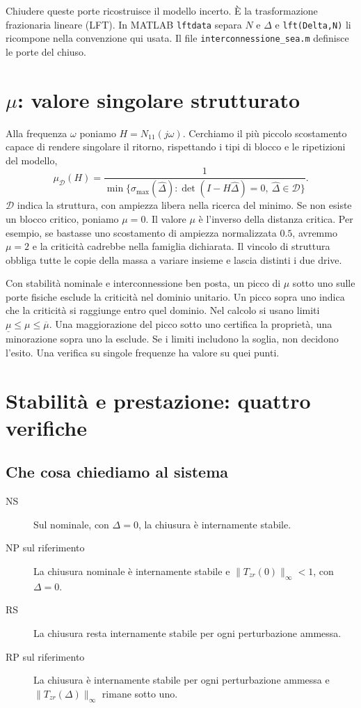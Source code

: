 Chiudere queste porte ricostruisce il modello incerto. È la
trasformazione frazionaria lineare (LFT). In MATLAB
\texttt{lftdata} separa $N$ e $\Delta$ e \texttt{lft(Delta,N)}
li ricompone nella convenzione qui usata. Il file
\texttt{interconnessione\_sea.m} definisce le porte del chiuso.

\section{\texorpdfstring{$\mu$}{mu}: valore singolare strutturato}

Alla frequenza $\omega$ poniamo $H=N_{11}(j\omega)$. Cerchiamo
il più piccolo scostamento capace di rendere singolare il ritorno,
rispettando i tipi di blocco e le ripetizioni del modello,
\begin{equation}\label{eq:mu-definition}
 \mu_{\mathcal D}(H)=
 \frac{1}{\min\{\sigma_{\max}(\widehat\Delta):
 \det(I-H\widehat\Delta)=0,\ \widehat\Delta\in\mathcal D\}}.
\end{equation}
$\mathcal D$ indica la struttura, con ampiezza libera nella ricerca
del minimo. Se non esiste un blocco critico, poniamo $\mu=0$.
Il valore $\mu$ è l'inverso della distanza critica. Per esempio,
se bastasse uno scostamento di ampiezza normalizzata $0.5$,
avremmo $\mu=2$ e la criticità cadrebbe nella famiglia dichiarata.
Il vincolo di struttura obbliga tutte le copie della massa a variare
insieme e lascia distinti i due drive.

Con stabilità nominale e interconnessione ben posta, un picco di
$\mu$ sotto uno sulle porte fisiche esclude la criticità nel dominio
unitario. Un picco sopra uno indica che la criticità si raggiunge
entro quel dominio. Nel calcolo si usano limiti
$\underline\mu\leq\mu\leq\overline\mu$. Una maggiorazione del picco
sotto uno certifica la proprietà, una minorazione sopra uno la
esclude. Se i limiti includono la soglia, non decidono l'esito.
Una verifica su singole frequenze ha valore su quei punti.

\section{Stabilità e prestazione: quattro verifiche}

\subsection{Che cosa chiediamo al sistema}

\begin{description}
 \item[NS] Sul nominale, con $\Delta=0$, la chiusura è internamente stabile.
 \item[NP sul riferimento] La chiusura nominale è internamente
 stabile e $\|T_{zr}(0)\|_\infty<1$, con $\Delta=0$.
 \item[RS] La chiusura resta internamente stabile per ogni perturbazione ammessa.
 \item[RP sul riferimento] La chiusura è internamente stabile per
 ogni perturbazione ammessa e $\|T_{zr}(\Delta)\|_\infty$ rimane sotto uno.
\end{description}

